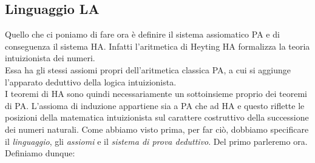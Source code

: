 \subsection{Linguaggio LA}
Quello che ci poniamo di fare ora è definire il sistema assiomatico PA e di conseguenza il sistema HA. Infatti l'aritmetica di Heyting HA formalizza la teoria intuizionista dei numeri.\\ Essa ha gli stessi assiomi propri dell'aritmetica classica PA, a cui si aggiunge l'apparato deduttivo della logica intuizionista. \\I teoremi di HA sono quindi necessariamente un sottoinsieme proprio dei teoremi di PA. L'assioma di induzione appartiene sia a PA che ad HA e questo riflette le posizioni della matematica intuizionista sul carattere costruttivo della successione dei numeri naturali. Come abbiamo visto prima, per far ci\`o, dobbiamo specificare il \textsl{linguaggio}, gli \textsl{assiomi} e il \textsl{sistema di prova deduttivo}. Del primo parleremo ora.
Definiamo dunque:
